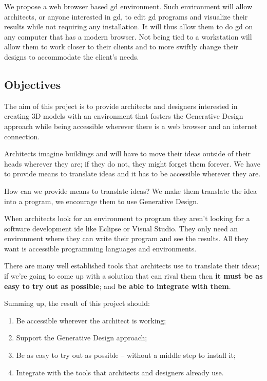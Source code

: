 \documentclass{./llncs2e/llncs}
\begin{document}
	We propose a web browser based \ac{gd} environment. 
	Such environment will allow architects, or anyone interested in \ac{gd}, to edit \ac{gd} programs and visualize their results while not requiring any installation. 
	It will thus allow them to do \ac{gd} on any computer that has a modern browser. 
	Not being tied to a workstation will allow them to work closer to their clients and to more swiftly change their designs to accommodate the client's needs.

\subsection{Objectives}
	The aim of this project is to provide architects and designers interested in creating 3D models with an environment that fosters the Generative Design approach while being accessible wherever there is a web browser and an internet connection.

	Architects imagine buildings and will have to move their ideas outside of their heads wherever they are; if they do not, they might forget them forever. 
	We have to provide means to translate ideas and it has to be accessible wherever they are.

	How can we provide means to translate ideas? We make them translate the idea into a program, we encourage them to use Generative Design.

	When architects look for an environment to program they aren't looking for a software development \ac{ide} like Eclipse or Visual Studio. 
	They only need an environment where they can write their program and see the results. 
	All they want is accessible programming languages and environments.

	There are many well established tools that architects use to translate their ideas; 
	if we're going to come up with a solution that can rival them then \textbf{it must be as easy to try out as possible}; 
	and \textbf{be able to integrate with them}.

	Summing up, the result of this project should:
	\begin{enumerate}
		\item Be accessible wherever the architect is working; \label{obj:access}
		\item Support the Generative Design approach; \label{obj:gen-design}
		\item Be as easy to try out as possible -- without a middle step to install it; \label{obj:no-install}
		\item Integrate with the tools that architects and designers already use.\label{obj:inter-op}
	\end{enumerate}
\end{document}
